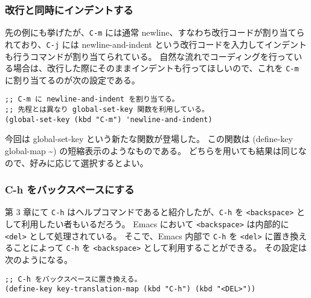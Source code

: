\subsubsection{改行と同時にインデントする}
先の例にも挙げたが、\texttt{C-m} には通常 newline、すなわち改行コードが割り当てられており、\texttt{C-j} には newline-and-indent という改行コードを入力してインデントも行うコマンドが割り当てられている。
自然な流れでコーディングを行っている場合は、改行した際にそのままインデントも行ってほしいので、これを \texttt{C-m} に割り当てるのが次の設定である。
\begin{mdframed}[roundcorner=0.50zw,leftmargin=3.00zw,rightmargin=3.00zw,skipabove=0.40zw,skipbelow=0.40zw,innertopmargin=4.00pt,innerbottommargin=4.00pt,innerleftmargin=5.00pt,innerrightmargin=5.00pt,linecolor=gray!020,linewidth=0.50pt,backgroundcolor=gray!20]
\begin{verbatim}
;; C-m に newline-and-indent を割り当てる。
;; 先程とは異なり global-set-key 関数を利用している。
(global-set-key (kbd "C-m") 'newline-and-indent)
\end{verbatim}
\end{mdframed}
今回は global-set-key という新たな関数が登場した。
この関数は (define-key global-map \textasciitilde) の短縮表示のようなものである。
どちらを用いても結果は同じなので、好みに応じて選択するとよい。
\subsubsection{C-h をバックスペースにする}
第 3 章にて \texttt{C-h} はヘルプコマンドであると紹介したが、\texttt{C-h} を \texttt{<backspace>} として利用したい者もいるだろう。
Emacs において \texttt{<backspace>} は内部的に \texttt{<del>} として処理されている。
そこで、Emacs 内部で \texttt{C-h} を \texttt{<del>} に置き換えることによって \texttt{C-h} を \texttt{<backspace>} として利用することができる。
その設定は次のようになる。
\begin{mdframed}[roundcorner=0.50zw,leftmargin=3.00zw,rightmargin=3.00zw,skipabove=0.40zw,skipbelow=0.40zw,innertopmargin=4.00pt,innerbottommargin=4.00pt,innerleftmargin=5.00pt,innerrightmargin=5.00pt,linecolor=gray!020,linewidth=0.50pt,backgroundcolor=gray!20]
\begin{verbatim}
;; C-h をバックスペースに置き換える。
(define-key key-translation-map (kbd "C-h") (kbd "<DEL>"))
\end{verbatim}
\end{mdframed}
